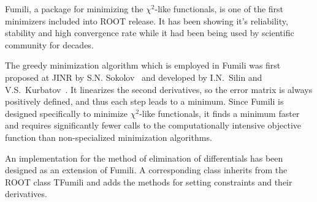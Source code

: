 
Fumili, a package for minimizing the $\chi^2$-like functionals, is one of the first minimizers included into ROOT release.
It has been showing it's reliability, stability and high convergence rate while it had been being used by scientific community for decades.

The greedy minimization algorithm which is employed in Fumili was first proposed at JINR by S.N. Sokolov~\cite{fum_1st} and developed by I.N.~Silin and V.S.~Kurbatov~\cite{fum_prog}.
It linearizes the second derivatives, so the error matrix is always positively defined, and thus each step leads to a minimum.
Since Fumili is designed specifically to minimize $\chi^2$-like functionals, it finds a minimum faster and requires significantly fewer calls to the computationally intensive objective function than non-specialized minimization algorithms.

An implementation for the method of elimination of differentials has been designed as an extension of Fumili.
A corresponding class inherits from the ROOT class TFumili and adds the methods for setting constraints and their derivatives.



%

